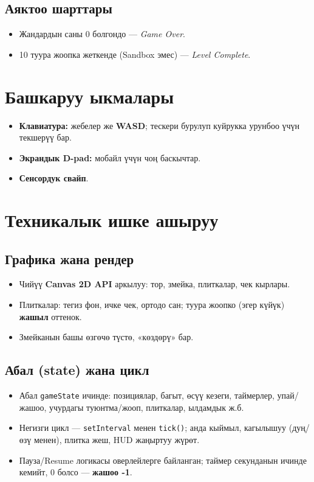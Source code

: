 \documentclass{article}
\begin{document}
\subsection{Аяктоо шарттары}
\begin{itemize}
  \item Жандардын саны 0 болгондо — \textit{Game Over}.
  \item 10 туура жоопка жеткенде (Sandbox эмес) — \textit{Level Complete}.
\end{itemize}

\section{Башкаруу ыкмалары}
\begin{itemize}
  \item \textbf{Клавиатура:} жебелер же \textbf{WASD}; тескери бурулуп куйрукка урунбоо үчүн текшерүү бар.
  \item \textbf{Экрандык D-pad:} мобайл үчүн чоң баскычтар.
  \item \textbf{Сенсордук свайп}.
\end{itemize}

\section{Техникалык ишке ашыруу}
\subsection{Графика жана рендер}
\begin{itemize}
  \item Чийүү \textbf{Canvas 2D API} аркылуу: тор, змейка, плиткалар, чек кырлары.
  \item Плиткалар: тегиз фон, ичке чек, ортодо сан; туура жоопко (эгер күйүк) \textbf{жашыл} оттенок.
  \item Змейканын башы өзгөчө түстө, «көздөрү» бар.
\end{itemize}

\subsection{Абал (state) жана цикл}
\begin{itemize}
  \item Абал \texttt{gameState} ичинде: позициялар, багыт, өсүү кезеги, таймерлер, упай/жашоо, учурдагы туюнтма/жооп, плиткалар, ылдамдык ж.б.
  \item Негизги цикл — \texttt{setInterval} менен \texttt{tick()}; анда кыймыл, кагылышуу (дуң/өзү менен), плитка жеш, HUD жаңыртуу жүрөт.
  \item Пауза/Resume логикасы оверлейлерге байланган; таймер секунданын ичинде кемийт, 0 болсо — \textbf{жашоо -1}.
\end{itemize}
\end{document}
